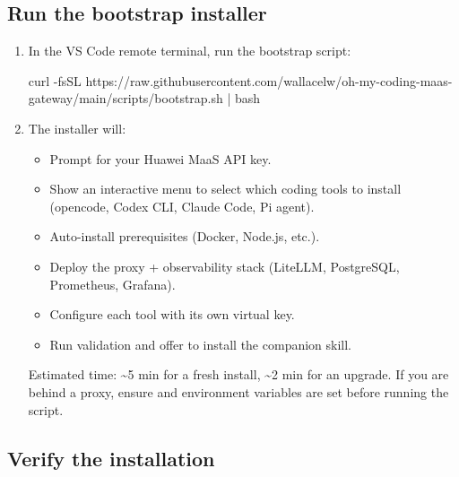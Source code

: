 \documentclass{guide}
\begin{document}
\subsection{Run the bootstrap installer}


\stepbystep
\begin{enumerate}
  \item In the VS Code remote terminal, run the bootstrap script:

  \begin{code}[bash]
curl -fsSL https://raw.githubusercontent.com/wallacelw/oh-my-coding-maas-gateway/main/scripts/bootstrap.sh | bash
  \end{code}

  \item The installer will:
    \begin{itemize}
      \item Prompt for your Huawei MaaS API key.
      \item Show an interactive menu to select which coding tools to install
            (opencode, Codex CLI, Claude Code, Pi agent).
      \item Auto-install prerequisites (Docker, Node.js, etc.).
      \item Deploy the proxy + observability stack (LiteLLM, PostgreSQL,
            Prometheus, Grafana).
      \item Configure each tool with its own virtual key.
      \item Run validation and offer to install the companion skill.
    \end{itemize}

  \begin{warning}
  Estimated time: \textasciitilde5 min for a fresh install, \textasciitilde2 min
  for an upgrade. If you are behind a proxy, ensure  and
   environment variables are set before running the script.
  \end{warning}
\end{enumerate}

\subsection{Verify the installation}
\end{document}
